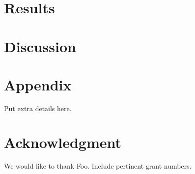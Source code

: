 \documentclass[]{article}
\begin{document}
\section{Results}

\section{Discussion}

\section*{Appendix}
Put extra details here.

\section*{Acknowledgment}
We would like to thank Foo. Include pertinent grant numbers.



\end{document}
